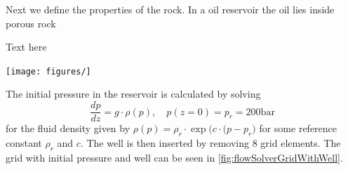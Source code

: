 Next we define the properties of the rock. In a oil reservoir the oil lies inside porous rock \begin{minipage}[c]{0.45\textwidth}
Text here
\end{minipage}
\begin{minipage}[c]{0.45\textwidth}
\texttt{[image: figures/]}
\caption{}
\label{fig:Er_Nor}
\end{minipage}
The initial pressure in the reservoir is calculated by solving
\begin{equation*}
    \frac{dp}{dz} = g\cdot \rho(p), \quad p(z = 0) = p_r = 200\text{bar} 
\end{equation*}  
for the fluid density given by $\rho(p) = \rho_r\cdot\exp\big(c\cdot(p-p_r\big)$ for some reference constant $\rho_r$ and $c$. The well is then inserted by removing 8 grid elements. The grid with initial pressure and well can be seen in \autoref{fig:flowSolverGridWithWell}.
